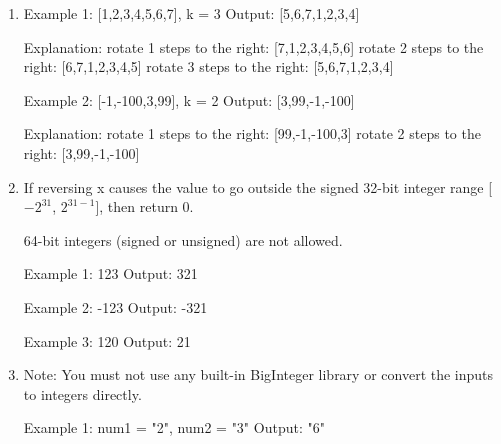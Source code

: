 
\underline{}
\newpage
\begin{enumerate}
\item {}


\begin{console}
Example 1: [1,2,3,4,5,6,7], k = 3
Output:    [5,6,7,1,2,3,4]

Explanation:
rotate 1 steps to the right: [7,1,2,3,4,5,6] 
rotate 2 steps to the right: [6,7,1,2,3,4,5] 
rotate 3 steps to the right: [5,6,7,1,2,3,4]

Example 2: [-1,-100,3,99], k = 2
Output:    [3,99,-1,-100]

Explanation:
rotate 1 steps to the right: [99,-1,-100,3]
rotate 2 steps to the right: [3,99,-1,-100]

\end{console}\newpage

\item {}

If reversing x causes the value to go outside the signed 32-bit integer range [$-2^{31}$,  $2^{31 - 1}$], then return 0.

64-bit integers (signed or unsigned) are not allowed.

\begin{console}
Example 1: 123 
Output:    321 

Example 2: -123 
Output:    -321 

Example 3: 120 
Output:    21
\end{console}\newpage

\item {}

Note: You must not use any built-in BigInteger library or convert the inputs to integers directly. 

\begin{console}
Example 1: num1 = "2", num2 = "3" 
Output:    "6" 


\end{console}
\end{enumerate}
